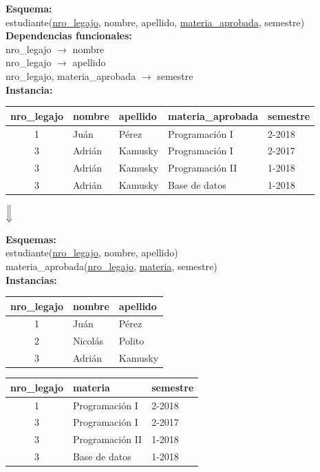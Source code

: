 \documentclass[preview]{standalone}
\begin{document}
\textbf{Esquema:}\\
estudiante(\underline{nro\_legajo}, nombre, apellido, \underline{materia\_aprobada}, semestre)\\

\textbf{Dependencias funcionales:}\\
nro\_legajo $\rightarrow$ nombre\\ 
nro\_legajo $\rightarrow$ apellido\\ 
nro\_legajo, materia\_aprobada $\rightarrow$ semestre \\

\textbf{Instancia:}
\begin{center}
\begin{tabular}{| c | l | l | l | l |}\hline			
	nro\_legajo & nombre & apellido & materia\_aprobada & semestre  \\\hline			
	1 & Ju\'an & P\'erez & Programaci\'on I & 2-2018 \\
	3 & Adri\'an & Kamusky & Programaci\'on I & 2-2017\\
	3 & Adri\'an & Kamusky & Programaci\'on II & 1-2018\\
	3 & Adri\'an & Kamusky & Base de datos & 1-2018\\\hline
\end{tabular}
\end{center}


\begin{center}
$\Big\Downarrow$
\end{center}
\textbf{Esquemas:}\\
estudiante(\underline{nro\_legajo}, nombre, apellido)\\
materia\_aprobada(\underline{nro\_legajo}, \underline{materia}, semestre)\\


\textbf{Instancias:}
\begin{center}
\begin{tabular}{| c | l | l |}\hline			
	nro\_legajo & nombre & apellido \\\hline			
	1 & Ju\'an & P\'erez \\
	2 & Nicol\'as & Polito \\
	3 & Adri\'an & Kamusky \\\hline
\end{tabular}
\quad
\begin{tabular}{| c | l | l |}\hline			
	nro\_legajo & materia & semestre\\\hline			
	1 & {\scriptsize{Programaci\'on I}} & 2-2018\\
	3 & {\scriptsize{Programaci\'on I}} & 2-2017 \\
	3 & {\scriptsize{Programaci\'on II}} & 1-2018 \\
	3 & {\scriptsize{Base de datos}} & 1-2018 \\\hline
\end{tabular}
\end{center}
\end{document}
